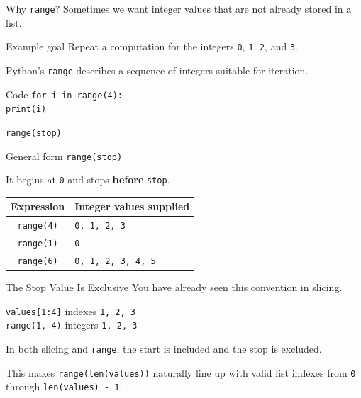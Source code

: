 \documentclass[aspectratio=169,10pt]{beamer}
\begin{document}

\begin{frame}{Why \texttt{range}?}
  Sometimes we want integer values that are not already stored in a list.

  \begin{block}{Example goal}
    Repeat a computation for the integers \texttt{0}, \texttt{1}, \texttt{2}, and \texttt{3}.
  \end{block}

  Python's \texttt{range} describes a sequence of integers suitable for iteration.

  \begin{block}{Code}
    \texttt{for i in range(4):}\\
    \hspace{0.20in}\texttt{print(i)}
  \end{block}
\end{frame}

\begin{frame}{\texttt{range(stop)}}
  \begin{block}{General form}
    \texttt{range(stop)}
  \end{block}

  It begins at \texttt{0} and stops \textbf{before} \texttt{stop}.

  \begin{center}
    \renewcommand{\arraystretch}{1.25}
    \begin{tabular}{c|l}
      \textbf{Expression} & \textbf{Integer values supplied} \\\hline
      \texttt{range(4)} & \texttt{0, 1, 2, 3} \\
      \texttt{range(1)} & \texttt{0} \\
      \texttt{range(6)} & \texttt{0, 1, 2, 3, 4, 5}
    \end{tabular}
  \end{center}
\end{frame}

\begin{frame}{The Stop Value Is Exclusive}
  You have already seen this convention in slicing.

  \begin{center}
    \texttt{values[1:4]} \qquad indexes \texttt{1, 2, 3}\\[0.18in]
    \texttt{range(1, 4)} \qquad integers \texttt{1, 2, 3}
  \end{center}

  \begin{keyidea}
    In both slicing and \texttt{range}, the start is included and the stop is excluded.
  \end{keyidea}

  This makes \texttt{range(len(values))} naturally line up with valid list indexes from \texttt{0} through \texttt{len(values) - 1}.
\end{frame}
\end{document}
